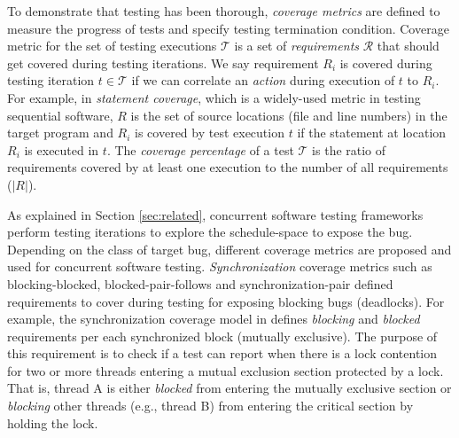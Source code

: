 %
To demonstrate that testing has been thorough, \textit{coverage metrics} are defined to measure the progress of tests and specify testing termination condition.
%
Coverage metric for the set of testing executions $\mathcal{T}$ is a set of \textit{requirements} $\mathcal{R}$ that should get covered during testing iterations.
%
We say requirement $R_i$ is covered during testing iteration $t \in \mathcal{T}$ if we can correlate an \textit{action} during execution of $t$ to $R_i$.
%
For example, in \textit{statement coverage}, which is a widely-used metric in testing sequential software, $R$ is the set of source locations (file and line numbers) in the target program and $R_i$ is covered by test execution $t$ if the statement at location $R_i$ is executed in $t$.
%
The \textit{coverage percentage} of a test $\mathcal{T}$ is the ratio of requirements covered by at least one execution to the number of all requirements ($|R|$).

As explained in Section \ref{sec:related}, concurrent software testing frameworks perform testing iterations to explore the schedule-space to expose the bug.
%
Depending on the class of target bug, different coverage metrics are proposed and used for concurrent software testing.
%
\textit{Synchronization} coverage metrics such as blocking-blocked\cite{edelstein2003contest}, blocked-pair-follows \cite{trainin-followsCoverage-padtad09} and synchronization-pair \cite{hong-syncTesting-issta12} defined requirements to cover during testing for exposing blocking bugs (\eg deadlocks).
%
%
For example, the synchronization coverage model in \cite{edelstein2003contest} defines \textit{blocking} and \textit{blocked} requirements per each synchronized block (\ie mutually exclusive).
%
The purpose of this requirement is to check if a test can report when there is a lock contention for two or more threads entering a mutual exclusion section protected by a lock.
%
That is, thread A is either \textit{blocked} from entering the mutually exclusive section or \textit{blocking} other threads (e.g., thread B) from entering the critical section by holding the lock.
%

